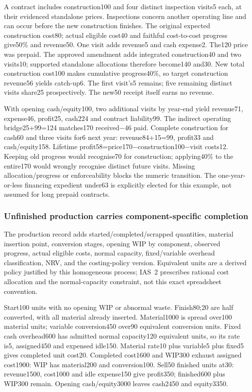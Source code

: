 A contract includes construction100 and four distinct inspection visits5 each, at their evidenced standalone prices. Inspections concern another operating line and can occur before the new construction finishes. The original expected construction cost80; actual eligible cost40 and faithful cost-to-cost progress give50\% and revenue50. One visit adds revenue5 and cash expense2. The120 price was prepaid. The approved amendment adds integrated construction40 and two visits10; supported standalone allocations therefore become140 and30. New total construction cost100 makes cumulative progress40\%, so target construction revenue56 yields catch-up6. The first visit's5 remains; five remaining distinct visits share25 prospectively. The new50 receipt itself earns no revenue.

With opening cash/equity100, two additional visits by year-end yield revenue71, expense46, profit25, cash224 and contract liability99. The indirect operating bridge25+99=124 matches170 received−46 paid. Complete construction for cash60 and three visits for6 next year: revenue84+15=99, profit33 and cash/equity158. Lifetime profit58=price170−construction100−visit costs12. Keeping old progress would recognise70 for construction; applying40\% to the entire170 would wrongly recognise distinct future visits. Missing allocation/progress or enforceability blocks the numeric transition. The one-year-or-less financing expedient under63 is explicitly elected for this example, not assumed for long prepaid contracts.

\hypertarget{unfinished-production-carries-component-specific-completion}{%
\subsubsection{Unfinished production carries component-specific completion}\label{unfinished-production-carries-component-specific-completion}}

The production record adds started/completed/scrapped quantities, material insertion point, conversion stages, opening WIP by component, observed progress, actual eligible costs, normal capacity, fixed/variable overhead classification, NRV, and the costing-policy version. Equivalent units are a derived policy justified by this homogeneous process; IAS~2 \citep[IAS~2.12--18]{eu20231803} prescribes rational cost allocation and the normal-capacity constraint, not this exact spreadsheet convention.

Start100 units with no opening WIP or abnormal waste. Finish80;20 are half converted, with all material already inserted. Material1000 is spread over100 material units; variable conversion450 over90 equivalent conversion units. Fixed cash overhead600 has admitted normal capacity120 equivalent units, so its rate is5, assigned450 and expensed idle150. Material rate10 plus variable5 plus fixed5 gives completed unit cost20. Completed cost1600 and WIP300 exhaust assigned cost1900: WIP has material200 and conversion100. Sell50 finished units at30: revenue1500, cost1000 and idle expense150 give profit350; finished600 plus WIP300 remain. Opening cash/equity3000 leaves cash2450 and equity3350.

